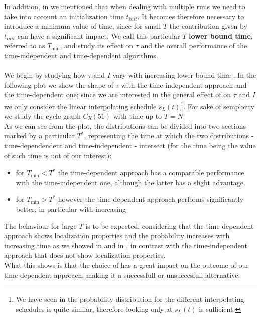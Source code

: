         \noindent
        In addition, in   we mentioned that when dealing with multiple runs we need to take into account an initialization time $t_{init}$. It becomes therefore necessary to introduce a minimum value of time, since for small $T$ the contribution given by $t_{init}$ can have a significant impact. We call this particular $T$ \textbf{lower bound time}, referred to as $T_{\min}$, and study its effect on $\tau$ and the overall performance of the time-independent and time-dependent algorithms. \\ \\

         We begin by studying how $\tau$ and $I$ vary with increasing lower bound time \tmin.
         In the following plot we show the shape of $\tau$ with the time-independent approach and the time-dependent one; since we are interested in the general effect of \tmin on $\tau$ and $I$ we only consider the linear interpolating schedule $s_L(t)$\footnote{We have seen in  the probability distribution for the different interpolating schedules is quite similar, therefore looking only at $s_L(t)$ is sufficient.}. For sake of semplicity we study the cycle graph $Cy(51)$ with time up to $T=N$\\
         

        As we can see from the plot, the distributions can be divided into two sections marked by a particular $T^*$, representing the time at which the two distributions - time-dependendent and time-independent - intersect (for the time being the value of such time is not of our interest):
        \begin{itemize}
            \item for $T_{\min}<T^*$ the time-dependent approach has a comparable performance with the time-independent one, although the latter has a slight advantage.
            \item for $T_{\min}>T^*$ however the time-dependent approach performs significantly better, in particular with increasing \tmin
        \end{itemize}
        The behaviour for large $T$ is to be expected, considering that the time-dependent approach shows localization properties and the probability increases with increasing time as we showed in  and in , in contrast with the time-independent approach that does not show localization properties.\\ What this shows is that the choice of \tmin has a great impact on the outcome of our time-dependent approach, making it a successfull or unsuccesfull alternative. \\

